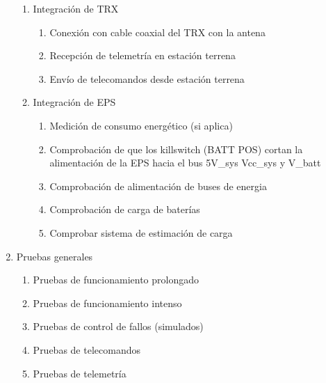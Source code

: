 \documentclass{article}
\begin{document}
\begin{enumerate}
\begin{enumerate}
\item Integración de TRX

\begin{enumerate}
\item Conexión con cable coaxial del TRX con la antena
\item Recepción de telemetría en estación terrena
\item Envío de telecomandos desde estación terrena
\end{enumerate}
\item Integración de EPS

\begin{enumerate}
\item Medición de consumo energético (si aplica)
\item Comprobación de que los killswitch (BATT POS) cortan la
alimentación de la EPS hacia el bus 5V\_sys Vcc\_sys y V\_batt
\item Comprobación de alimentación de buses de energia
\item Comprobación de carga de baterías
\item Comprobar sistema de estimación de carga
\end{enumerate}
\end{enumerate}
\item Pruebas generales

\begin{enumerate}
\item Pruebas de funcionamiento prolongado
\item Pruebas de funcionamiento intenso
\item Pruebas de control de fallos (simulados)
\item Pruebas de telecomandos
\item Pruebas de telemetría
\end{enumerate}
\end{enumerate}
\end{document}

